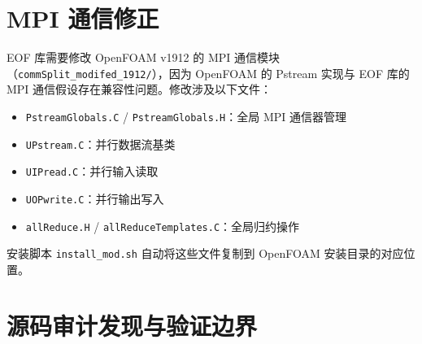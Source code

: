 \documentclass[11pt,a4paper]{article}
\begin{document}
\section{MPI 通信修正}

EOF 库需要修改 OpenFOAM v1912 的 MPI 通信模块（\texttt{commSplit\_modifed\_1912/}），因为 OpenFOAM 的 Pstream 实现与 EOF 库的 MPI 通信假设存在兼容性问题。修改涉及以下文件：

\begin{itemize}
    \item \texttt{PstreamGlobals.C} / \texttt{PstreamGlobals.H}：全局 MPI 通信器管理
    \item \texttt{UPstream.C}：并行数据流基类
    \item \texttt{UIPread.C}：并行输入读取
    \item \texttt{UOPwrite.C}：并行输出写入
    \item \texttt{allReduce.H} / \texttt{allReduceTemplates.C}：全局归约操作
\end{itemize}

安装脚本 \texttt{install\_mod.sh} 自动将这些文件复制到 OpenFOAM 安装目录的对应位置。

\section{源码审计发现与验证边界}
\end{document}
